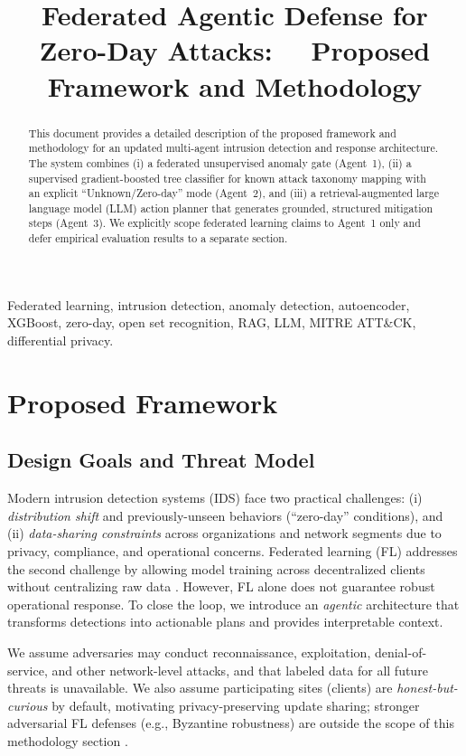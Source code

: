 \documentclass[conference]{IEEEtran}
\title{Federated Agentic Defense for Zero-Day Attacks: \ \ Proposed Framework and Methodology}
\author{\IEEEauthorblockN{Author Names Omitted for Review}\n\IEEEauthorblockA{Department / University\\
Email: contact@domain}}
\begin{document}
\maketitle

\begin{abstract}
This document provides a detailed description of the proposed framework and methodology for an updated multi-agent intrusion detection and response architecture. The system combines (i) a federated unsupervised anomaly gate (Agent~1), (ii) a supervised gradient-boosted tree classifier for known attack taxonomy mapping with an explicit ``Unknown/Zero-day'' mode (Agent~2), and (iii) a retrieval-augmented large language model (LLM) action planner that generates grounded, structured mitigation steps (Agent~3). We explicitly scope federated learning claims to Agent~1 only and defer empirical evaluation results to a separate section.
\end{abstract}

\begin{IEEEkeywords}
Federated learning, intrusion detection, anomaly detection, autoencoder, XGBoost, zero-day, open set recognition, RAG, LLM, MITRE ATT\&CK, differential privacy.
\end{IEEEkeywords}

\section{Proposed Framework}
\subsection{Design Goals and Threat Model}
Modern intrusion detection systems (IDS) face two practical challenges: (i) \emph{distribution shift} and previously-unseen behaviors (``zero-day'' conditions), and (ii) \emph{data-sharing constraints} across organizations and network segments due to privacy, compliance, and operational concerns. Federated learning (FL) addresses the second challenge by allowing model training across decentralized clients without centralizing raw data \cite{mcmahan2017fedavg,kairouz2021flsurvey}. However, FL alone does not guarantee robust operational response. To close the loop, we introduce an \emph{agentic} architecture that transforms detections into actionable plans and provides interpretable context.

We assume adversaries may conduct reconnaissance, exploitation, denial-of-service, and other network-level attacks, and that labeled data for all future threats is unavailable. We also assume participating sites (clients) are \emph{honest-but-curious} by default, motivating privacy-preserving update sharing; stronger adversarial FL defenses (e.g., Byzantine robustness) are outside the scope of this methodology section \cite{blanchard2017byzantine}. 
\end{document}
